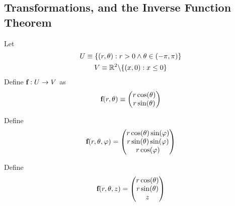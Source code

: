 \documentclass[11pt]{article}
\begin{document}
		\subsection{Transformations, and the Inverse Function Theorem}
			\begin{example}
				Let
				\begin{gather}
					U \equiv \{(r, \theta): r > 0 \land \theta \in (-\pi, \pi)\} \\
					V \equiv \mathbb{R}^2 \backslash \{(x,0): x \leq 0\}
				\end{gather}
				Define $\textbf{f}: U \to V$ as
				\begin{equation}
					\textbf{f}(r, \theta) \equiv \begin{pmatrix}
 						r\cos(\theta) \\
 						r\sin(\theta)
 					\end{pmatrix}
				\end{equation}
			\end{example}
			
			\begin{example}
				Define
				\begin{equation}
					\textbf{f}(r, \theta, \varphi) = \begin{pmatrix}
						r \cos(\theta) \sin(\varphi) \\
						r \sin(\theta) \sin(\varphi) \\
						r\cos(\varphi)
					\end{pmatrix}
				\end{equation}
			\end{example}
			
			\begin{example}
				Define
				\begin{equation}
					\textbf{f}(r, \theta, z) = \begin{pmatrix}
						r \cos(\theta) \\
						r \sin(\theta) \\
						z
					\end{pmatrix}
				\end{equation}
			\end{example}
			
\end{document}
